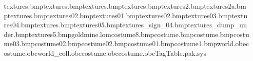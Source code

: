 textures\track.bmp textures\flask.bmp textures\gurdera.bmp textures\gurderend.bmp textures\gurderend2.bmp textures\gurderend2a.bmp textures\gurdergrey.bmp textures\sand02.bmp textures\sandrock01.bmp textures\sandrock02.bmp textures\sandrock03.bmp textures\sandrock04.bmp textures\sleeper.bmp textures\spookyrock05.bmp textures\ticket_sign_04.bmp textures\ammo_dump_under.bmp textures\tunrock5.bmp goldmine.lom costume\browtree8.bmp costume\gurdergrey.bmp costume\trunkend.bmp costume\minerbelt03.bmp costume\base02.bmp costume\minerbelt02.bmp costume\minerbelt01.bmp costume\minelamp1.bmp world.obe costume\minerpickaxe.obe world_coll.obe costume\minerbelt.obe costume\minerhelmet.obe TagTable.pak.sys 